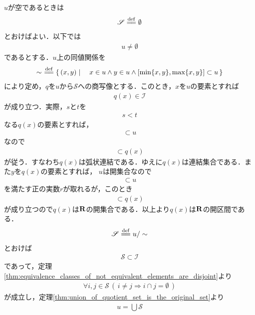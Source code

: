 	\begin{sketch}
		$u$が空であるときは
		\begin{align}
			\mathscr{S} \defeq \emptyset 
		\end{align}
		とおけばよい．以下では
		\begin{align}
			u \neq \emptyset
		\end{align}
		であるとする．$u$上の同値関係を
		\begin{align}
			\sim\ \defeq \Set{(x,y)}{x \in u \wedge y \in u \wedge \left[\min\{x,y\},\max\{x,y\}\right] \subset u}
		\end{align}
		により定め，$q$を$u$から$\mathscr{S}$への商写像とする．このとき，$x$を$u$の要素とすれば
		\begin{align}
			q(x) \in \mathscr{I}
		\end{align}
		が成り立つ．実際，$s$と$t$を
		\begin{align}
			s < t
		\end{align}
		なる$q(x)$の要素とすれば，
		\begin{align}
			[s,t] \subset u
		\end{align}
		なので
		\begin{align}
			[s,t] \subset q(x)
		\end{align}
		が従う．すなわち$q(x)$は弧状連結である．ゆえに$q(x)$は連結集合である．また$y$を$q(x)$の要素とすれば，
		$u$は開集合なので
		\begin{align}
			[y-r,y+r] \subset u
		\end{align}
		を満たす正の実数$r$が取れるが，このとき
		\begin{align}
			[y-r,y+r] \subset q(x)
		\end{align}
		が成り立つので$q(x)$は$\mathbf{R}$の開集合である．以上より$q(x)$は$\mathbf{R}$の開区間である．
		\begin{align}
			\mathscr{S} \defeq u/\sim
		\end{align}
		とおけば
		\begin{align}
			\mathscr{S} \subset \mathscr{I}
		\end{align}
		であって，定理\ref{thm:equivalence_classes_of_not_equivalent_elements_are_disjoint}より
		\begin{align}
			\forall i,j \in \mathscr{S}\, \left(\, i \neq j \Longrightarrow i \cap j = \emptyset\, \right)
		\end{align}
		が成立し，定理\ref{thm:union_of_quotient_set_is_the_original_set}より
		\begin{align}
			u = \bigcup \mathscr{S}
		\end{align}

\end{sketch}
